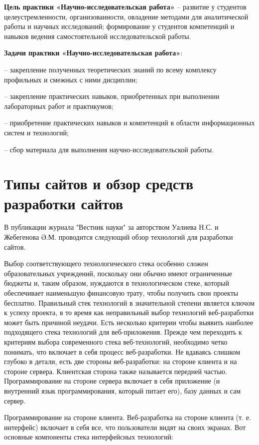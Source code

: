 
\textbf{Цель практики «Научно-исследовательская работа»} – развитие у студентов целеустремленности, организованности, овладение методами для    аналитической работы и научных исследований; формирование у студентов компетенций и навыков ведения самостоятельной исследовательской работы.

\textbf{Задачи практики «Научно-исследовательская работа»}:

-- закрепление полученных теоретических знаний по всему комплексу профильных и смежных с ними дисциплин;

-- закрепление практических навыков, приобретенных при выполнении лабораторных работ и практикумов;

-- приобретение практических навыков и компетенций в области информационных систем и технологий;

-- сбор материала для выполнения научно-исследовательской работы.
\clearpage
\section{Типы сайтов и обзор средств разработки сайтов}

В публикации \cite{ualiev-jebegenov-issledovanie} журнала "Вестник науки" за авторством Уалиева Н.С. и Жебегенова Ә.М. проводится следующий обзор технологий для разработки сайтов.

Выбор соответствующего технологического стека особенно сложен образовательных учреждений, поскольку они обычно имеют ограниченные бюджеты и, таким образом, нуждаются в технологическом стеке, который обеспечивает наименьшую финансовую трату, чтобы получить свои проекты бесплатно.
Правильный стек технологий в значительной степени является ключом к успеху проекта, в то время как неправильный выбор технологий веб-разработки может быть причиной неудачи.
Есть несколько критерии чтобы выявить наиболее подходящего стека технологий для веб-приложения.
Прежде чем переходить к критериям выбора современного стека веб-технологий, необходимо четко понимать, что включает в себя процесс веб-разработки.
Не вдаваясь слишком глубоко в детали, есть две стороны веб-разработки: на стороне клиента и на стороне сервера.
Клиентская сторона также называется передней частью.
Программирование на стороне сервера включает в себя приложение (и внутренний язык программирования, который питает его), базу данных и сам сервер.

Программирование на стороне клиента.
Веб-разработка на стороне клиента (т. е. интерфейс) включает в себя все, что пользователи видят на своих экранах. Вот основные компоненты стека интерфейсных технологий:

